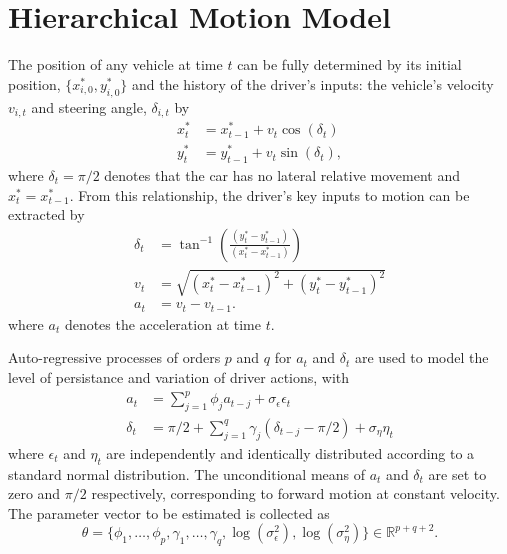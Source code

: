 \documentclass[12pt,a4paper]{article}\usepackage[]{graphicx}\usepackage[]{color}
\begin{document}
\section{Hierarchical Motion Model}

The position of any vehicle at time $t$ can be fully determined by its initial position, $\{x^*_{i, 0}, y^*_{i, 0}\}$ and the history of the driver's inputs: the vehicle's velocity $v_{i, t}$ and steering angle, $\delta_{i, t}$ by
\begin{align}
x^*_{t} &= x^*_{t-1} + v_{t} \cos(\delta_{t}) \label{xEq} \\
y^*_{t} &= y^*_{t-1} + v_{t} \sin(\delta_{t}) \label{yEq},
\end{align}
where $\delta_{t} = \pi/2$ denotes that the car has no lateral relative movement and $x^*_{t} = x^*_{t-1}$.
From this relationship, the driver's key inputs to motion can be extracted by
\begin{align}
\delta_{t} &= \tan^{-1}\left(\frac{(y^*_{t} - y^*_{t-1})}{(x^*_{t} - x^*_{t-1})} \right) \label{dEq} \\
v_{t} &= \sqrt{(x^*_{t} - x^*_{t-1})^2 + (y^*_{t} - y^*_{t-1})^2} \label{vEq} \\
a_{t} &= v_{t} - v_{t-1}. \label{aEq}
\end{align}
where $a_{t}$ denotes the acceleration at time $t$.

Auto-regressive processes of orders $p$ and $q$ for $a_t$ and  $\delta_t$ are used to model the level of persistance and variation of driver actions, with
\begin{align}
a_{t} &= \sum_{j = 1}^p \phi_{j} a_{t-j} + \sigma_{\epsilon} \epsilon_{t} \label{aAR} \\
\delta_{t} &= \pi/2 + \sum_{j = 1}^q \gamma_{j} (\delta_{t-j} - \pi/2) + \sigma_{\eta} \eta_{t} \label{dAR}
\end{align}
where $\epsilon_{t}$ and $\eta_t$ are independently and identically distributed according to a standard normal distribution. The unconditional means of $a_t$ and $\delta_t$ are set to zero and $\pi/2$ respectively, corresponding to forward motion at constant velocity. The parameter vector to be estimated is collected as 
\begin{equation*}
\label{thetaVec}
\theta = \{\phi_{1}, \dots, \phi_{p}, \gamma_{1}, \dots, \gamma_{q}, \log(\sigma^{2}_{\epsilon}), \log(\sigma^{2}_{\eta})\} \in \mathbb{R}^{p + q + 2}.
\end{equation*}
\end{document}
